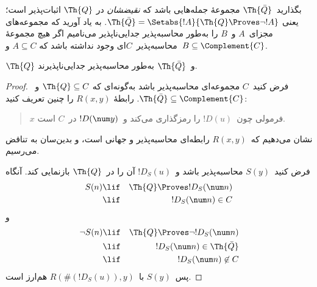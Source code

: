 \documentclass[../../../include/open-logic-section]{subfiles}
\begin{document}



بگذارید~$\Th{\bar Q}$ مجموعهٔ جمله‌هایی باشد که {\em نقیضشان} در
$\Th{Q}$ اثبات‌پذیر است؛ یعنی
$\Th{\bar Q} = \Setabs{!A}{\Th{Q} \Proves \lnot !A}$. به یاد آورید که
مجموعه‌های مجزای~$A$ و~$B$ را به‌طور محاسبه‌پذیر جدایی‌ناپذیر می‌نامیم
اگر هیچ مجموعهٔ محاسبه‌پذیر~$C$ای وجود نداشته باشد که
$A \subseteq C$ و~$B \subseteq \Complement{C}$.

\begin{lem}
$\Th{Q}$ و~$\Th{\bar Q}$ به‌طور محاسبه‌پذیر جدایی‌ناپذیرند.
\end{lem}

\begin{proof}
فرض کنید~$C$ مجموعه‌ای محاسبه‌پذیر باشد به‌گونه‌ای که
$\Th{Q} \subseteq C$ و~$\Th{\bar Q} \subseteq \Complement{C}$. رابطهٔ
$R(x,y)$ را چنین تعریف کنید:
\begin{quote}
$x$ فرمولی چون~$!D(u)$ را رمزگذاری می‌کند و~$!D(\num y)$ در~$C$ است.
\end{quote}
نشان می‌دهیم که~$R(x,y)$ رابطه‌ای محاسبه‌پذیر و جهانی است، و بدین‌سان
به تناقض می‌رسیم.

فرض کنید~$S(y)$ محاسبه‌پذیر باشد و~$!D_S(u)$ آن را در~$\Th{Q}$
بازنمایی کند. آنگاه
\begin{eqnarray*}
S(n) & \lif & \Th{Q} \Proves !D_S(\num n) \\
& \lif & !D_S(\num n) \in C
\end{eqnarray*}
و
\begin{eqnarray*}
\lnot S(n) & \lif & \Th{Q} \Proves \lnot !D_S(\num n) \\
& \lif & !D_S(\num n) \in \Th{\bar Q} \\
& \lif & !D_S(\num n) \not\in C
\end{eqnarray*}
پس~$S(y)$ با~$R(\#(!D_S(u)),y)$ هم‌ارز است.
\end{proof}
\end{document}
